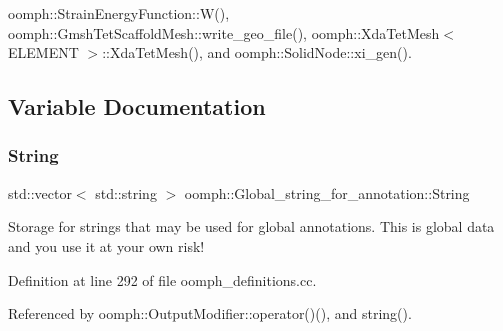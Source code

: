 oomph\+::\+Strain\+Energy\+Function\+::\+W(), oomph\+::\+Gmsh\+Tet\+Scaffold\+Mesh\+::write\+\_\+geo\+\_\+file(), oomph\+::\+Xda\+Tet\+Mesh$<$ E\+L\+E\+M\+E\+N\+T $>$\+::\+Xda\+Tet\+Mesh(), and oomph\+::\+Solid\+Node\+::xi\+\_\+gen().



\subsection{Variable Documentation}
\mbox{\label{namespaceoomph_1_1Global__string__for__annotation_a3e4fe39c6055ee6fe5c367533905591b}} 
\subsubsection{\texorpdfstring{String}{String}}
{\footnotesize\ttfamily std\+::vector$<$ std\+::string $>$ oomph\+::\+Global\+\_\+string\+\_\+for\+\_\+annotation\+::\+String}



Storage for strings that may be used for global annotations. This is global data and you use it at your own risk! 



Definition at line 292 of file oomph\+\_\+definitions.\+cc.



Referenced by oomph\+::\+Output\+Modifier\+::operator()(), and string().

